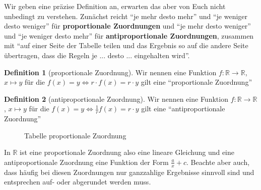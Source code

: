 \documentclass[a4paper]{book}%
\theoremstyle{definition}
\newtheorem{definition}{Definition}
\begin{document}
Wir geben eine präzise Definition an, erwarten das aber von Euch nicht unbedingt zu verstehen. Zunächst reicht \enquote{je mehr desto mehr} und \enquote{je weniger desto weniger} für \textbf{proportionale Zuordnungen} und \enquote{je mehr desto weniger} und \enquote{je weniger desto mehr} für \textbf{antiproportionale Zuordnungen}, zusammen mit \enquote{auf einer Seite der Tabelle teilen und das Ergebnis so auf die andere Seite übertragen, dass die Regeln je ... desto ... eingehalten wird}.

\begin{definition}[proportionale Zuordnung]
    Wir nennen eine Funktion $f: \mathbb{R} \rightarrow \mathbb{R}$, $x \mapsto y$ für die $f(x)=y \Leftrightarrow r \cdot f(x)= r\cdot y$ gilt eine \enquote{proportionale Zuordnung}
\end{definition}

\begin{definition}[antiproportionale Zuordnung]
    Wir nennen eine Funktion $f: \mathbb{R} \rightarrow \mathbb{R}$, $x \mapsto y$ für die $f(x)=y \Leftrightarrow \frac{1}{r} f(x)= r\cdot y$ gilt eine \enquote{antiproportionale Zuordnung}
\end{definition}

\begin{figure}
  \centering
  \caption{Tabelle proportionale Zuordnung}\label{fig:ProportionaleZuordnung}
\end{figure}


In $\mathbb{R}$ ist eine proportionale Zuordnung also eine lineare Gleichung und eine antiproportionale Zuordnung eine Funktion der Form $\frac{a}{x} + c$. Beachte aber auch, dass häufig bei diesen Zuordnungen nur ganzzahlige Ergebnisse sinnvoll sind und entsprechen auf- oder abgerundet werden muss.
\end{document}
